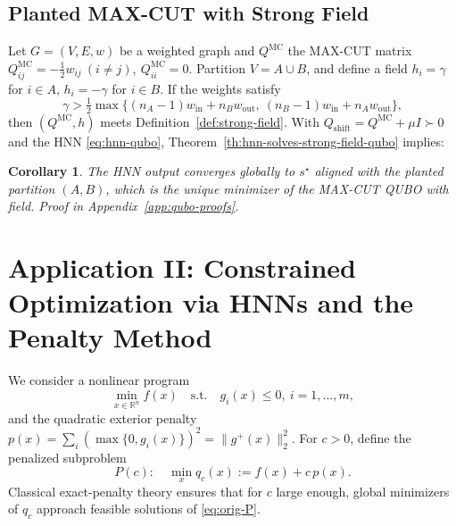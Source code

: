 \documentclass[journal]{IEEEtran}
\newtheorem{corollary}{Corollary}
\begin{document}
\subsection{Planted MAX-CUT with Strong Field}\label{subsec:planted-maxcut}
Let \(G=(V,E,w)\) be a weighted graph and \(Q^{\mathrm{MC}}\) the MAX-CUT matrix
\(
Q^{\mathrm{MC}}_{ij}=-\tfrac12 w_{ij}\ (i\ne j),\ Q^{\mathrm{MC}}_{ii}=0.
\)
Partition \(V=A\cup B\), and define a field \(h_i=\gamma\) for \(i\in A\), \(h_i=-\gamma\) for \(i\in B\).
If the weights satisfy
\begin{equation}\label{eq:gamma-condition}
  \gamma>\tfrac12\max\!\big\{(n_A-1)w_{\mathrm{in}}\!+\!n_B w_{\mathrm{out}},\ (n_B-1)w_{\mathrm{in}}\!+\!n_A w_{\mathrm{out}}\big\},
\end{equation}
then \((Q^{\mathrm{MC}},h)\) meets Definition~\ref{def:strong-field}. With \(Q_{\mathrm{shift}}=Q^{\mathrm{MC}}+\mu I\succ0\) and the HNN \eqref{eq:hnn-qubo}, Theorem~\ref{th:hnn-solves-strong-field-qubo} implies:
\begin{corollary}\label{cor:hnn-planted-maxcut}
The HNN output converges globally to \(s^\star\) aligned with the planted partition \((A,B)\), which is the unique minimizer of the MAX-CUT QUBO with field. Proof in Appendix~\ref{app:qubo-proofs}.
\end{corollary}

\section{Application II: Constrained Optimization via HNNs and the Penalty Method}
\label{sec:penalty-HNN}

We consider a nonlinear program
\begin{equation}\label{eq:orig-P}
  \min_{x\in\mathbb{R}^n} f(x)\quad\text{s.t.}\quad g_i(x)\le 0,\ i=1,\dots,m,
\end{equation}
and the quadratic exterior penalty \(p(x)=\sum_i (\max\{0,g_i(x)\})^2=\|g^+(x)\|_2^2\).
For \(c>0\), define the penalized subproblem
\begin{equation}\label{eq:penalty-Pc}
  P(c):\quad \min_{x} q_c(x):=f(x)+c\,p(x).
\end{equation}
Classical exact-penalty theory ensures that for \(c\) large enough, global minimizers of \(q_c\) approach feasible solutions of \eqref{eq:orig-P}.
\end{document}

